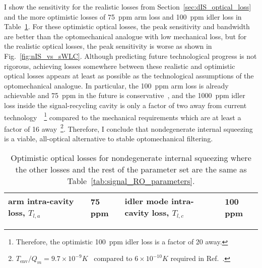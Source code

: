 I show the sensitivity for the realistic losses from Section~\ref{sec:dIS_optical_loss} and the more optimistic losses of 75~ppm arm loss and 100~ppm idler loss in Table~\ref{tab:ideal_loss}. For these optimistic optical losses, the peak sensitivity and bandwidth are better than the optomechanical analogue with low mechanical loss, but for the realistic optical losses, the peak sensitivity is worse as shown in Fig.~\ref{fig:nIS_vs_sWLC}. Although predicting future technological progress is not rigorous, achieving losses somewhere between these realistic and optimistic optical losses appears at least as possible as the technological assumptions of the optomechanical analogue. In particular, the 100~ppm arm loss is already achievable and 75~ppm in the future is conservative~\cite{hardwick_2019}, and the 1000~ppm idler loss inside the signal-recycling cavity is only a factor of two away from current technology~\cite{barsottiLIGOdoc2016}~\footnote{Therefore, the optimistic 100~ppm idler loss is a factor of 20 away.} compared to the mechanical requirements which are at least a factor of 16 away~\footnote{$T_\text{env}/Q_m=9.7\times 10^{-9} K$~\cite{masonetal2019} compared to $6\times 10^{-10}K$ required in Ref.~\cite{miaoEnhancingBandwidthGravitationalWave2015}.}.
Therefore, I conclude that nondegenerate internal squeezing is a viable, all-optical alternative to stable optomechanical filtering. %

\begin{table}[t]
\centering
\begin{tabular}{@{}ll|ll@{}}
\toprule
arm intra-cavity loss, $T_{l,a}$ & 75 ppm & idler mode intra-cavity loss, $T_{l,c}$ & 100 ppm \\ \bottomrule
\end{tabular}
\caption{Optimistic optical losses for nondegenerate internal squeezing where the other losses and the rest of the parameter set are the same as Table~\ref{tab:signal_RO_parameters}.}
\label{tab:ideal_loss}
\end{table}



